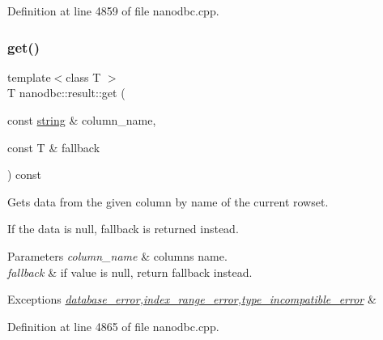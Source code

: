 Definition at line 4859 of file nanodbc.\+cpp.

\mbox{\label{classnanodbc_1_1result_a447e4575031945386b584c576c3a89bd}} 
\subsubsection{\texorpdfstring{get()}{get()}\hspace{0.1cm}{\footnotesize\ttfamily [4/4]}}
{\footnotesize\ttfamily template$<$class T $>$ \\
T nanodbc\+::result\+::get (\begin{DoxyParamCaption}\item[{const \mbox{\hyperlink{namespacenanodbc_abfc0ece56278e590911ec8352774c212}{string}} \&}]{column\+\_\+name,  }\item[{const T \&}]{fallback }\end{DoxyParamCaption}) const}



Gets data from the given column by name of the current rowset. 

If the data is null, fallback is returned instead.


\begin{DoxyParams}{Parameters}
{\em column\+\_\+name} & column\textquotesingle{}s name. \\
\hline
{\em fallback} & if value is null, return fallback instead. \\
\hline
\end{DoxyParams}

\begin{DoxyExceptions}{Exceptions}
{\em \mbox{\hyperlink{classnanodbc_1_1database__error}{database\+\_\+error}},\mbox{\hyperlink{classnanodbc_1_1index__range__error}{index\+\_\+range\+\_\+error}},\mbox{\hyperlink{classnanodbc_1_1type__incompatible__error}{type\+\_\+incompatible\+\_\+error}}} & \\
\hline
\end{DoxyExceptions}


Definition at line 4865 of file nanodbc.\+cpp.

\mbox{\label{classnanodbc_1_1result_ad606b9ccfa02d6dbdae7a28c7a92bb14}} 
